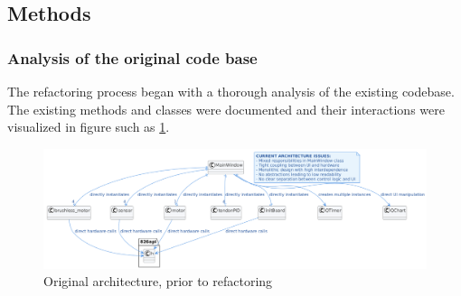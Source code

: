 \subsection{Methods}
\subsubsection{Analysis of the original code base}
The refactoring process began with a thorough analysis of the existing codebase. The existing methods and classes were documented and their interactions were visualized in figure such as \ref{fig:oldarchitecture}.
\begin{figure} [H]
    \centering
    \includegraphics[width=1.1\linewidth]{images/Software documentation/old code/architecture2.png}
    \caption{Original architecture, prior to refactoring}
    \label{fig:oldarchitecture}
\end{figure}
